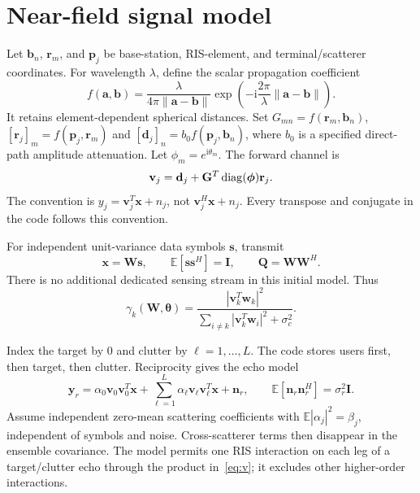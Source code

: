 \documentclass[11pt,a4paper]{article}
\begin{document}
\section{Near-field signal model}
Let $\mathbf b_n$, $\mathbf r_m$, and $\mathbf p_j$ be base-station, RIS-element, and terminal/scatterer coordinates. For wavelength $\lambda$, define the scalar propagation coefficient
\begin{equation}
 f(\mathbf a,\mathbf b)=\frac{\lambda}{4\pi\|\mathbf a-\mathbf b\|}
 \exp\!\left(-\mathrm i\frac{2\pi}{\lambda}\|\mathbf a-\mathbf b\|\right).
\end{equation}
It retains element-dependent spherical distances. Set $G_{mn}=f(\mathbf r_m,\mathbf b_n)$, $[\mathbf r_j]_m=f(\mathbf p_j,\mathbf r_m)$ and $[\mathbf d_j]_n=b_0 f(\mathbf p_j,\mathbf b_n)$, where $b_0$ is a specified direct-path amplitude attenuation. Let $\phi_m=e^{\mathrm i\theta_m}$. The forward channel is
\begin{equation}\label{eq:v}
 \mathbf v_j=\mathbf d_j+\mathbf G^T\operatorname{diag}(\boldsymbol\phi)\mathbf r_j.
\end{equation}
The convention is $y_j=\mathbf v_j^T\mathbf x+n_j$, not $\mathbf v_j^H\mathbf x+n_j$. Every transpose and conjugate in the code follows this convention.

For independent unit-variance data symbols $\mathbf s$, transmit
\begin{equation}
 \mathbf x=\mathbf W\mathbf s,\qquad \mathbb E[\mathbf s\mathbf s^H]=\mathbf I,
 \qquad \mathbf Q=\mathbf W\mathbf W^H.
\end{equation}
There is no additional dedicated sensing stream in this initial model. Thus
\begin{equation}\label{eq:sinr}
 \gamma_k(\mathbf W,\boldsymbol\theta)=
 \frac{|\mathbf v_k^T\mathbf w_k|^2}
 {\sum_{i\ne k}|\mathbf v_k^T\mathbf w_i|^2+\sigma_c^2}.
\end{equation}

Index the target by $0$ and clutter by $\ell=1,\ldots,L$. The code stores users first, then target, then clutter. Reciprocity gives the echo model
\begin{equation}
 \mathbf y_r=\alpha_0\mathbf v_0\mathbf v_0^T\mathbf x+
 \sum_{\ell=1}^{L}\alpha_\ell\mathbf v_\ell\mathbf v_\ell^T\mathbf x+\mathbf n_r,
 \qquad\mathbb E[\mathbf n_r\mathbf n_r^H]=\sigma_r^2\mathbf I.
\end{equation}
Assume independent zero-mean scattering coefficients with $\mathbb E|\alpha_j|^2=\beta_j$, independent of symbols and noise. Cross-scatterer terms then disappear in the ensemble covariance. The model permits one RIS interaction on each leg of a target/clutter echo through the product in~\eqref{eq:v}; it excludes other higher-order interactions.
\end{document}
